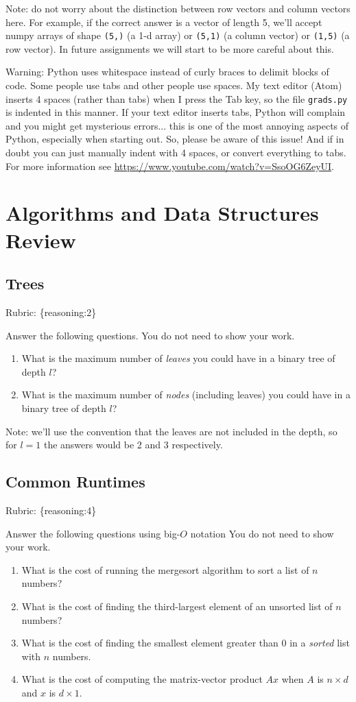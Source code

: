 \documentclass{article}
\def\rubric#1{\gre{Rubric: \{#1\}}}{}
\def\blu#1{{\color{blu}#1}}
\def\gre#1{{\color{gre}#1}}
\begin{document}
Note: do not worry about the distinction between row vectors and column vectors here.
For example, if the correct answer is a vector of length 5, we'll accept numpy arrays
of shape \texttt{(5,)} (a 1-d array) or \texttt{(5,1)} (a column vector) or
\texttt{(1,5)} (a row vector). In future assignments we will start to be more careful
about this.

Warning: Python uses whitespace instead of curly braces to delimit blocks of code.
Some people use tabs and other people use spaces. My text editor (Atom) inserts 4 spaces (rather than tabs) when
I press the Tab key, so the file \texttt{grads.py} is indented in this manner. If your text editor inserts tabs,
Python will complain and you might get mysterious errors... this is one of the most annoying aspects
of Python, especially when starting out. So, please be aware of this issue! And if in doubt you can just manually
indent with 4 spaces, or convert everything to tabs. For more information
see \url{https://www.youtube.com/watch?v=SsoOG6ZeyUI}.

\section{Algorithms and Data Structures Review}

\subsection{Trees}
\rubric{reasoning:2}

\blu{Answer the following questions.} You do not need to show your work.

\begin{enumerate}
\item What is the maximum number of \emph{leaves} you could have in a binary tree of depth $l$?
\item What is the maximum number of \emph{nodes} (including leaves) you could have in a binary tree of depth $l$?
\end{enumerate}
Note: we'll use the convention that the leaves are not included in the depth, so for $l=1$ the answers would be 2 and 3 respectively.

\subsection{Common Runtimes}
\rubric{reasoning:4}

\blu{Answer the following questions using big-$O$ notation} You do not need to show your work.
\begin{enumerate}
\item What is the cost of running the mergesort algorithm to sort  a list of $n$ numbers?
\item What is the cost of finding the third-largest element of an unsorted list of $n$ numbers?
\item What is the cost of finding the smallest element greater than 0 in a \emph{sorted} list with $n$ numbers.
\item What is the cost of computing the matrix-vector product $Ax$ when $A$ is $n \times d$ and $x$ is $d \times 1$.
\end{enumerate}
\end{document}
